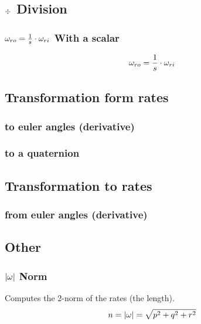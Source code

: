 \subsection{$\division$ Division}
\subsubsection*{$\ra{ro} = \frac 1 s \multiplication \ra{ri}$ With a scalar}
\begin{equation}
\ra{ro} = \frac 1 s \multiplication \ra{ri}
\end{equation}


\subsection{Transformation form rates}
\subsubsection*{to euler angles (derivative)}


\subsubsection*{to a quaternion}



\subsection{Transformation to rates}
\subsubsection*{from euler angles (derivative)}




\subsection{Other}
\subsubsection*{$\norm{\ra{}}$ Norm}
Computes the 2-norm of the rates (the length).
\begin{equation}
n = \norm{\ra{}} = \sqrt{p^2 +q^2+r^2}
\end{equation}

